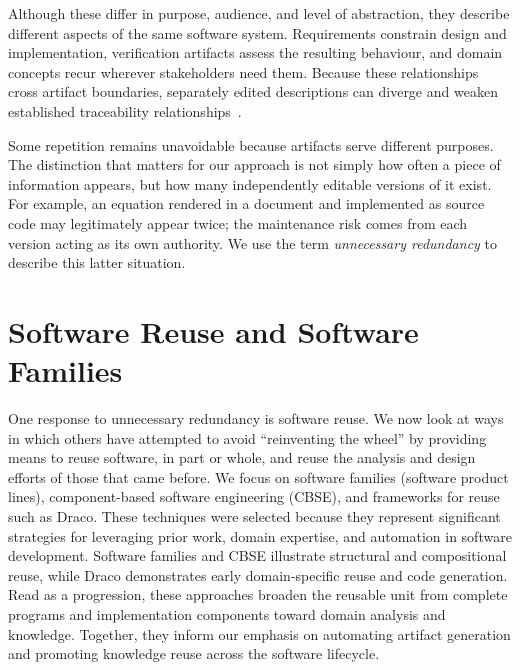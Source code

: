 Although these \sfs{} differ in purpose, audience, and level of abstraction,
they describe different aspects of the same software system.
Requirements constrain design and implementation, verification artifacts
assess the resulting behaviour, and domain concepts recur wherever
stakeholders need them. Because these relationships cross artifact boundaries,
separately edited descriptions can diverge and weaken established traceability
relationships~\citep{Galster2011,WinklerAndPilgrim2010}.

Some repetition remains unavoidable because artifacts serve different
purposes. The distinction that matters for our approach is not simply how
often a piece of information appears, but how many independently editable
versions of it exist. For example, an equation rendered in a document and implemented as
source code may legitimately appear twice; the maintenance risk comes from
each version acting as its own authority. We use the term
\emph{unnecessary redundancy}
to describe this latter situation.

\clearpage
{}

\section{Software Reuse and Software Families}
\label{sec:bg_families}

One response to unnecessary redundancy is software reuse. We now look at ways
in which others have attempted to avoid
``reinventing the wheel'' by providing means to reuse software, in part or
whole, and reuse the analysis and design efforts of those that came before.
We focus on software families (software product lines), component-based
software engineering (CBSE), and frameworks for reuse such as Draco. These
techniques were selected because they represent significant strategies for
leveraging prior work, domain expertise, and automation in software
development. Software families and CBSE illustrate structural and compositional
reuse, while Draco demonstrates early domain-specific reuse and code
generation.
Read as a progression, these approaches broaden the reusable unit from
complete programs and implementation components toward domain analysis and
knowledge. Together, they inform our emphasis on automating artifact generation
and promoting knowledge reuse across the software lifecycle.


